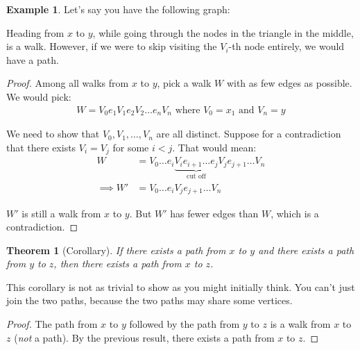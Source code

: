 \documentclass[]{article}
\newtheorem*{theorem}{Theorem}
\theoremstyle{definition}
\newtheorem{ex}{Example}[section]
\newcommand{\lecture}[1]{\marginpar{{\footnotesize $\leftarrow$ \underline{#1}}}}
\begin{document}
			\lecture{February 27, 2013}
			\begin{ex}
				Let's say you have the following graph:
				\begin{center}
				\end{center}

				Heading from $x$ to $y$, while going through the nodes in the triangle in the middle, is a walk. However, if we were to skip visiting the $V_i$-th node entirely, we would have a path.
			\end{ex}

			\begin{proof}
				Among all walks from $x$ to $y$, pick a walk $W$ with as few edges as possible. We would pick:
				\begin{align*}
					W = V_0e_1V_1e_2V_2 \ldots e_nV_n \text{ where } V_0 = x_1 \text{ and } V_n = y
				\end{align*}

				We need to show that $V_0, V_1, \ldots, V_n$ are all distinct. Suppose for a contradiction that there exists $V_i = V_j$ for some $i < j$. That would mean:
				\begin{align*}
					W &= V_0 \ldots e_i \underbrace{V_ie_{i + 1} \ldots e_j}_{\text{cut off}} V_je_{j + 1} \ldots V_n \\
					\implies W' &= V_0 \ldots e_iV_je_{j + 1} \ldots V_n
				\end{align*}

				$W'$ is still a walk from $x$ to $y$. But $W'$ has fewer edges than $W$, which is a contradiction.
			\end{proof}

			\begin{theorem}[Corollary]
				If there exists a path from $x$ to $y$ and there exists a path from $y$ to $z$, then there exists a path from $x$ to $z$.
			\end{theorem}

			This corollary is not as trivial to show as you might initially think. You can't just join the two paths, because the two paths may share some vertices. 
			\begin{proof}
				The path from $x$ to $y$ followed by the path from $y$ to $z$ is a walk from $x$ to $z$ (\emph{not} a path). By the previous result, there exists a path from $x$ to $z$.
			\end{proof}
\end{document}
